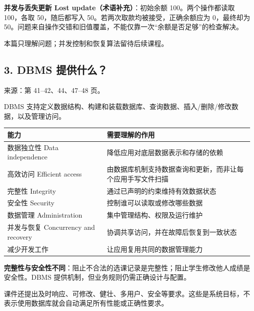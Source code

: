 \textbf{并发与丢失更新 Lost update（术语补充）}：初始余额 100。两个操作都读取 100，各取 50，随后都写入 50。若两次取款均被接受，正确余额应为 0，最终却为 50。问题来自操作交错和旧值覆盖，不能仅靠一次``余额是否足够''的检查解决。

本篇只理解问题；并发控制和恢复算法留待后续课程。

\subsection{3. DBMS 提供什么？}\label{01_database_fundamentals_zh-dbms-ux63d0ux4f9bux4ec0ux4e48}

来源：第 41--42、44、47--48 页。

DBMS 支持定义数据结构、构建和装载数据库、查询数据、插入/删除/修改数据，以及管理访问。

\begin{longtable}[]{@{}
  >{\raggedright\arraybackslash}p{}
  >{\raggedright\arraybackslash}p{}@{}}
\toprule\noalign{}
\begin{minipage}[b]{\linewidth}\raggedright
能力
\end{minipage} & \begin{minipage}[b]{\linewidth}\raggedright
需要理解的作用
\end{minipage} \\
\midrule\noalign{}
\endhead
\bottomrule\noalign{}
\endlastfoot
数据独立性 Data independence & 降低应用对底层数据表示和存储的依赖 \\
高效访问 Efficient access & 由数据库机制支持数据查询和更新，而非让每个应用手写文件扫描 \\
完整性 Integrity & 通过已声明的约束维持有效数据状态 \\
安全性 Security & 控制谁可以读取或修改哪些数据 \\
数据管理 Administration & 集中管理结构、权限及运行维护 \\
并发与恢复 Concurrency and recovery & 协调共享访问，并在故障后恢复到一致状态 \\
减少开发工作 & 让应用复用共同的数据管理能力 \\
\end{longtable}

\textbf{完整性与安全性不同}：阻止不合法的选课记录是完整性；阻止学生修改他人成绩是安全性。DBMS 提供机制，但业务规则仍需正确设计与配置。

课件还提出及时响应、可修改、健壮、多用户、安全等要求。这些是系统目标，不表示使用数据库就会自动满足所有性能或正确性要求。

